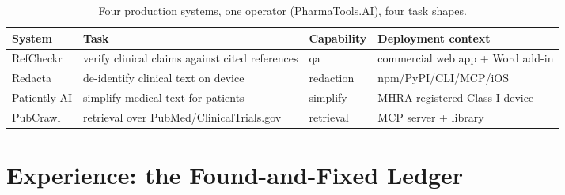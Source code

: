 \documentclass[11pt,a4paper]{article}
\begin{document}
\begin{table}[h]
\centering
\small
\begin{tabularx}{\textwidth}{l X l l}
\toprule
\textbf{System} & \textbf{Task} & \textbf{Capability} & \textbf{Deployment context}\\
\midrule
RefCheckr & verify clinical claims against cited references & qa & commercial web app + Word add-in\\
Redacta & de-identify clinical text on device & redaction & npm/PyPI/CLI/MCP/iOS\\
Patiently AI & simplify medical text for patients & simplify & MHRA-registered Class I device\\
PubCrawl & retrieval over PubMed/ClinicalTrials.gov & retrieval & MCP server + library\\
\bottomrule
\end{tabularx}
\caption{Four production systems, one operator (PharmaTools.AI), four task shapes.}
\label{tab:systems}
\end{table}

\section{Experience: the Found-and-Fixed Ledger}
\label{sec:ledger}
\end{document}
